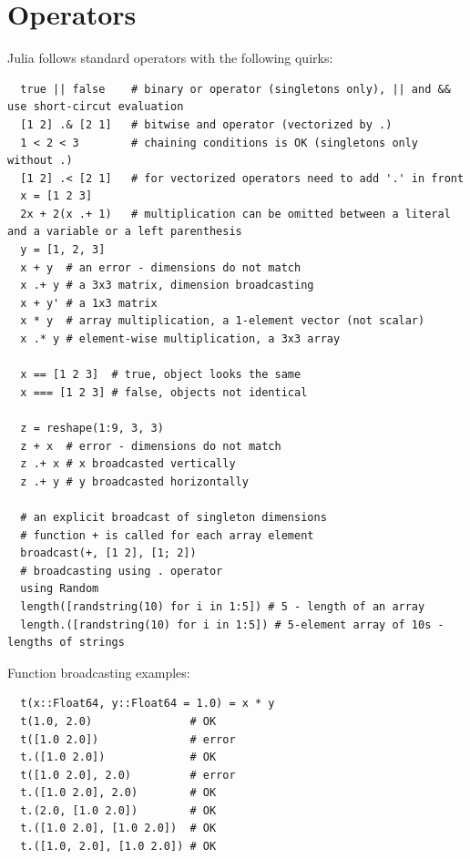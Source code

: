 \documentclass[10pt,a4paper]{article}
\begin{document}
\section{Operators}
Julia follows standard operators with the following quirks:
\begin{lstlisting}
  true || false    # binary or operator (singletons only), || and && use short-circut evaluation
  [1 2] .& [2 1]   # bitwise and operator (vectorized by .)
  1 < 2 < 3        # chaining conditions is OK (singletons only without .)
  [1 2] .< [2 1]   # for vectorized operators need to add '.' in front
  x = [1 2 3]
  2x + 2(x .+ 1)   # multiplication can be omitted between a literal and a variable or a left parenthesis
  y = [1, 2, 3]
  x + y  # an error - dimensions do not match
  x .+ y # a 3x3 matrix, dimension broadcasting
  x + y' # a 1x3 matrix
  x * y  # array multiplication, a 1-element vector (not scalar)
  x .* y # element-wise multiplication, a 3x3 array

  x == [1 2 3]  # true, object looks the same
  x === [1 2 3] # false, objects not identical

  z = reshape(1:9, 3, 3)
  z + x  # error - dimensions do not match
  z .+ x # x broadcasted vertically
  z .+ y # y broadcasted horizontally

  # an explicit broadcast of singleton dimensions
  # function + is called for each array element
  broadcast(+, [1 2], [1; 2])
  # broadcasting using . operator
  using Random
  length([randstring(10) for i in 1:5]) # 5 - length of an array
  length.([randstring(10) for i in 1:5]) # 5-element array of 10s - lengths of strings
\end{lstlisting}

Function broadcasting examples:
\begin{lstlisting}
  t(x::Float64, y::Float64 = 1.0) = x * y
  t(1.0, 2.0)               # OK
  t([1.0 2.0])              # error
  t.([1.0 2.0])             # OK
  t([1.0 2.0], 2.0)         # error
  t.([1.0 2.0], 2.0)        # OK
  t.(2.0, [1.0 2.0])        # OK
  t.([1.0 2.0], [1.0 2.0])  # OK
  t.([1.0, 2.0], [1.0 2.0]) # OK
\end{lstlisting}
\end{document}

